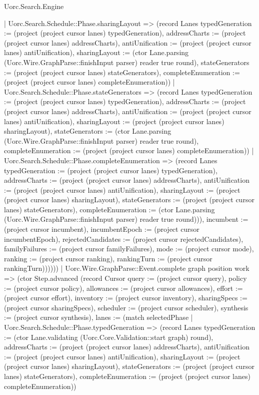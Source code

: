 \begin{lexlean}{Uorc.Search.Engine}
\begin{semanticmodule}
{{            | Uorc.Search.Schedule::Phase.sharingLayout => (record Lanes {typedGeneration := (project (project cursor lanes) typedGeneration), addressCharts := (project (project cursor lanes) addressCharts), antiUnification := (project (project cursor lanes) antiUnification), sharingLayout := (ctor Lane.parsing (Uorc.Wire.GraphParse::finishInput parser) reader true round), stateGenerators := (project (project cursor lanes) stateGenerators), completeEnumeration := (project (project cursor lanes) completeEnumeration)})
            | Uorc.Search.Schedule::Phase.stateGenerators => (record Lanes {typedGeneration := (project (project cursor lanes) typedGeneration), addressCharts := (project (project cursor lanes) addressCharts), antiUnification := (project (project cursor lanes) antiUnification), sharingLayout := (project (project cursor lanes) sharingLayout), stateGenerators := (ctor Lane.parsing (Uorc.Wire.GraphParse::finishInput parser) reader true round), completeEnumeration := (project (project cursor lanes) completeEnumeration)})
            | Uorc.Search.Schedule::Phase.completeEnumeration => (record Lanes {typedGeneration := (project (project cursor lanes) typedGeneration), addressCharts := (project (project cursor lanes) addressCharts), antiUnification := (project (project cursor lanes) antiUnification), sharingLayout := (project (project cursor lanes) sharingLayout), stateGenerators := (project (project cursor lanes) stateGenerators), completeEnumeration := (ctor Lane.parsing (Uorc.Wire.GraphParse::finishInput parser) reader true round)})), incumbent := (project cursor incumbent), incumbentEpoch := (project cursor incumbentEpoch), rejectedCandidates := (project cursor rejectedCandidates), familyFailures := (project cursor familyFailures), mode := (project cursor mode), ranking := (project cursor ranking), rankingTurn := (project cursor rankingTurn)})))))
      | Uorc.Wire.GraphParse::Event.complete graph position work => (ctor Step.advanced (record Cursor {query := (project cursor query), policy := (project cursor policy), allowances := (project cursor allowances), effort := (project cursor effort), inventory := (project cursor inventory), sharingSpecs := (project cursor sharingSpecs), scheduler := (project cursor scheduler), synthesis := (project cursor synthesis), lanes := (match selectedPhase
        | Uorc.Search.Schedule::Phase.typedGeneration => (record Lanes {typedGeneration := (ctor Lane.validating (Uorc.Core.Validation::start graph) round), addressCharts := (project (project cursor lanes) addressCharts), antiUnification := (project (project cursor lanes) antiUnification), sharingLayout := (project (project cursor lanes) sharingLayout), stateGenerators := (project (project cursor lanes) stateGenerators), completeEnumeration := (project (project cursor lanes) completeEnumeration)})
}}
\end{semanticmodule}
\end{lexlean}
